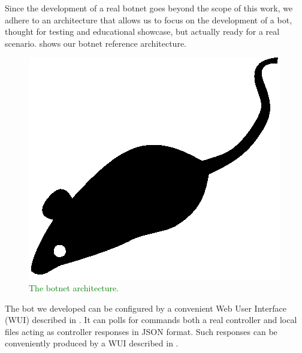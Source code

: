 Since the development of a real botnet goes beyond the scope of this work, we adhere to an architecture that allows us to focus on the development of a bot, thought for testing and educational showcase, but actually ready for a real scenario.  shows our botnet reference architecture.

\begin{figure}[tp]
  \centering
  \includegraphics{./fig/acmlarge-mouse}
  \caption{\textcolor{green}{The botnet architecture.}}
    \label{fig:botnet-architecture}
\end{figure}

\textcolor{blue}{\lipsum[1]}
\begin{description}
  \setlength\itemsep{1em}
  \item[INIT INTERFACE] \textcolor{blue}{\lipsum[1]}

  \item[COMMAND INTERFACE] \textcolor{blue}{\lipsum[1]}

  \item[LOG INTERFACE] \textcolor{blue}{\lipsum[1]}

\end{description}

The bot we developed can be configured by a convenient Web User Interface (WUI) described in . It can polls for commands both a real controller and local files acting as controller responses in JSON format. Such responses can be conveniently produced by a WUI described in .
